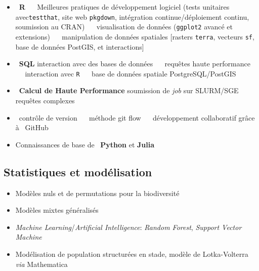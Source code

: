 \documentclass[10pt,a4paper,]{article}
\providecommand{\tightlist}{%
  \setlength{\itemsep}{0pt}\setlength{\parskip}{0pt}}
\begin{document}
\begin{itemize}
\tightlist
\item
  \faRProject~\textbf{R} ~\textbullet~ Meilleures pratiques de
  développement logiciel (tests unitaires avec\texttt{testthat}, site
  web \texttt{pkgdown}, intégration continue/déploiement continu,
  soumission au CRAN) ~\textbullet~ visualisation de données
  (\texttt{ggplot2} avancé et extensions) ~\textbullet~ manipulation de
  données spatiales {[}rasters \texttt{terra}, vecteurs \texttt{sf},
  base de données PostGIS, et interactions{]}
\item
  \faDatabase~\textbf{SQL} interaction avec des bases de données
  ~\textbullet~ requêtes haute performance ~\textbullet~ interaction
  avec \texttt{R} ~\textbullet~ base de données spatiale
  PostgreSQL/PostGIS
\item
  \faServer~\textbf{Calcul de Haute Performance} soumission de
  \emph{job} sur SLURM/SGE ~\textbullet~ requêtes complexes
\item
  \faGit~contrôle de version ~\textbullet~ méthode git flow
  ~\textbullet~ développement collaboratif grâce à \faGithub~GitHub
\item
  Connaissances de base de \faPython~\textbf{Python} et \textbf{Julia}
\end{itemize}

\hypertarget{statistiques-et-moduxe9lisation}{%
\subsection{Statistiques et
modélisation}\label{statistiques-et-moduxe9lisation}}

\begin{itemize}
\tightlist
\item
  Modèles nuls et de permutations pour la biodiversité
\item
  Modèles mixtes généralisés
\item
  \emph{Machine Learning}/\emph{Artificial Intelligence}: \emph{Random
  Forest}, \emph{Support Vector Machine}
\item
  Modélisation de population structurées en stade, modèle de
  Lotka-Volterra \emph{via} Mathematica
\end{itemize}
\end{document}
